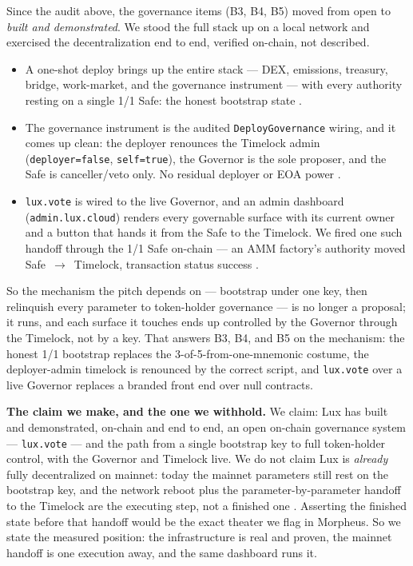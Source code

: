 \documentclass[11pt,a4paper]{article}
\newcommand{\code}[1]{\texttt{\small #1}}
\newcommand{\prov}[1]{{\color{muted}\footnotesize\sffamily[#1]}}
\begin{document}
Since the audit above, the governance items (B3, B4, B5) moved from open to \emph{built and
demonstrated}. We stood the full stack up on a local network and exercised the decentralization
end to end, verified on-chain, not described.

\begin{itemize}
\item A one-shot deploy brings up the entire stack --- DEX, emissions, treasury, bridge,
  work-market, and the governance instrument --- with every authority resting on a single 1/1
  Safe: the honest bootstrap state \prov{verified: local net}.
\item The governance instrument is the audited \code{DeployGovernance} wiring, and it comes up
  clean: the deployer renounces the Timelock admin (\code{deployer=false}, \code{self=true}), the
  Governor is the sole proposer, and the Safe is canceller/veto only. No residual deployer or EOA
  power \prov{verified: on-chain reads}.
\item \code{lux.vote} is wired to the live Governor, and an admin dashboard (\code{admin.lux.cloud})
  renders every governable surface with its current owner and a button that hands it from the Safe
  to the Timelock. We fired one such handoff through the 1/1 Safe on-chain --- an AMM factory's
  authority moved Safe~$\rightarrow$~Timelock, transaction status success \prov{verified}.
\end{itemize}

So the mechanism the pitch depends on --- bootstrap under one key, then relinquish every parameter
to token-holder governance --- is no longer a proposal; it runs, and each surface it touches ends
up controlled by the Governor through the Timelock, not by a key. That answers B3, B4, and B5 on
the mechanism: the honest 1/1 bootstrap replaces the 3-of-5-from-one-mnemonic costume, the
deployer-admin timelock is renounced by the correct script, and \code{lux.vote} over a live
Governor replaces a branded front end over null contracts.

\textbf{The claim we make, and the one we withhold.} We claim: Lux has built and demonstrated,
on-chain and end to end, an open on-chain governance system --- \code{lux.vote} --- and the path
from a single bootstrap key to full token-holder control, with the Governor and Timelock live. We
do not claim Lux is \emph{already} fully decentralized on mainnet: today the mainnet parameters
still rest on the bootstrap key, and the network reboot plus the parameter-by-parameter handoff to
the Timelock are the executing step, not a finished one \prov{pending}. Asserting the finished
state before that handoff would be the exact theater we flag in Morpheus. So we state the measured
position: the infrastructure is real and proven, the mainnet handoff is one execution away, and
the same dashboard runs it.
\end{document}
